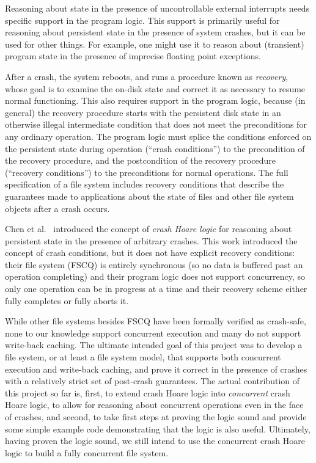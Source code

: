 Reasoning about state in the presence of uncontrollable external
interrupts needs
specific support in the program logic.
This support is primarily useful for reasoning about persistent state
in the presence of system crashes, but it can be used for other
things.
For example, one might use it to reason about (transient) program
state in the presence of imprecise floating point exceptions.

After a crash, the system reboots, and runs a procedure
known as \emph{recovery}, whose goal is to examine the on-disk state
and correct it as necessary to resume normal functioning.
This also requires support in the program logic, because (in general)
the recovery procedure starts with the persistent disk state in an
otherwise illegal intermediate condition that does not meet the
preconditions for any ordinary operation.
The program logic must splice the conditions enforced on the
persistent state during operation (``crash conditions'') to the
precondition of the recovery procedure, and the postcondition of the
recovery procedure (``recovery conditions'') to the preconditions for
normal operations.
The full specification of a file system includes recovery conditions
that describe the guarantees made to applications about the state of
files and other file system objects after a crash occurs.

Chen et al.~\cite{chen2015using} introduced the concept of \emph{crash
Hoare logic} for reasoning about persistent state in the presence of
arbitrary crashes.
This work introduced the concept of crash conditions, but it does not
have explicit recovery conditions: their file system (FSCQ) is
entirely synchronous (so no data is buffered past an operation
completing) and their program logic does not support concurrency, so
only one operation can be in progress at a time and their recovery
scheme either fully completes or fully aborts it.

While other file systems besides FSCQ have been formally verified as
crash-safe, none to our knowledge support concurrent execution and
many do not support write-back caching.
The ultimate intended goal of this project was to develop a file
system, or at least a file system model, that supports both concurrent
execution and write-back caching, and prove it correct in the presence
of crashes with a relatively strict set of post-crash guarantees.
The actual contribution of this project so far is, first, to extend
crash Hoare logic into \emph{concurrent} crash Hoare logic, to allow
for reasoning about concurrent operations even in the face of crashes,
and second, to take first steps at proving the
logic sound and provide some simple example code demonstrating that
the logic is also useful.
Ultimately, having proven the logic sound, we still intend to use the
concurrent crash Hoare logic to build a fully concurrent file system.

